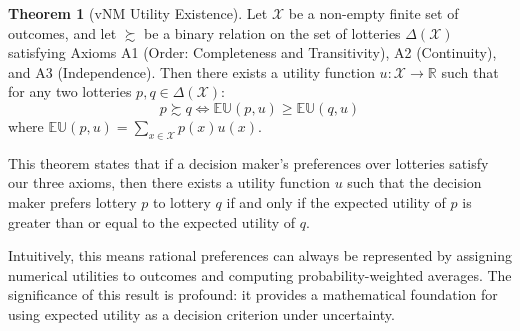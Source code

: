 \documentclass{article}
\theoremstyle{definition}
\newtheorem{theorem}[definition]{Theorem}
\newcommand{\R}{\mathbb{R}}
\newcommand{\X}{\mathcal{X}}
\newcommand{\EU}{\mathbb{EU}}
\newcommand{\DeltaX}{\Delta(\X)} %
\newcommand{\pref}{\succsim} %
\begin{document}
\begin{theorem}[vNM Utility Existence]\label{thm:utility_existence}
Let $\X$ be a non-empty finite set of outcomes, and let $\pref$ be a binary relation on the set of lotteries $\DeltaX$ satisfying Axioms A1 (Order: Completeness and Transitivity), A2 (Continuity), and A3 (Independence). Then there exists a utility function $u: \X \to \R$ such that for any two lotteries $p, q \in \DeltaX$:
\[ p \pref q \iff \EU(p, u) \ge \EU(q, u) \]
where $\EU(p, u) = \sum_{x \in \X} p(x)u(x)$.
\end{theorem}

This theorem states that if a decision maker's preferences over lotteries satisfy our three axioms, then there exists a utility function $u$ such that the decision maker prefers lottery $p$ to lottery $q$ if and only if the expected utility of $p$ is greater than or equal to the expected utility of $q$.

Intuitively, this means rational preferences can always be represented by assigning numerical utilities to outcomes and computing probability-weighted averages. The significance of this result is profound: it provides a mathematical foundation for using expected utility as a decision criterion under uncertainty.
\end{document}
